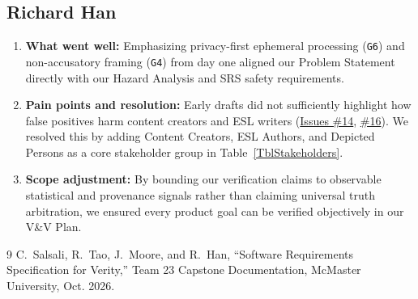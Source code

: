 \documentclass[11pt]{article}
\begin{document}
\subsection*{Richard Han}
\begin{enumerate}[leftmargin=*]
    \item \textbf{What went well:} Emphasizing privacy-first ephemeral processing (\texttt{G6}) and non-accusatory framing (\texttt{G4}) from day one aligned our Problem Statement directly with our Hazard Analysis and SRS safety requirements.
    \item \textbf{Pain points and resolution:} Early drafts did not sufficiently highlight how false positives harm content creators and ESL writers (\href{https://github.com/richy1337/Verity/issues/14}{Issues \#14}, \href{https://github.com/richy1337/Verity/issues/16}{\#16}). We resolved this by adding Content Creators, ESL Authors, and Depicted Persons as a core stakeholder group in Table~\ref{TblStakeholders}.
    \item \textbf{Scope adjustment:} By bounding our verification claims to observable statistical and provenance signals rather than claiming universal truth arbitration, we ensured every product goal can be verified objectively in our V\&V Plan.
\end{enumerate}

\begin{thebibliography}{9}
C.~Salsali, R.~Tao, J.~Moore, and R.~Han, ``Software Requirements Specification for Verity,'' Team 23 Capstone Documentation, McMaster University, Oct. 2026.
\end{thebibliography}
\end{document}
